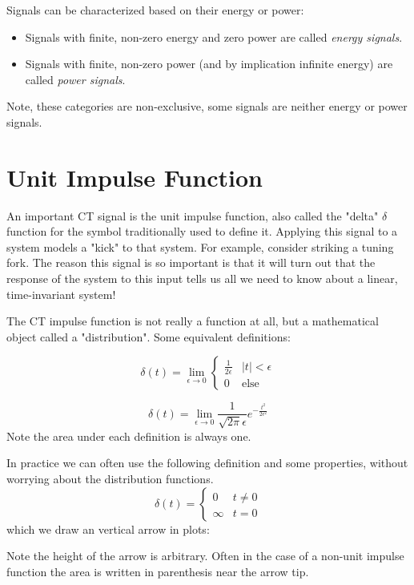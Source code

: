 Signals can be characterized based on their energy or power:  
\begin{itemize}
\item Signals with finite, non-zero energy and zero power are called {\it energy signals}.
\item Signals with finite, non-zero power (and by implication infinite energy) are called {\it power signals}.
\end{itemize}

Note, these categories are non-exclusive, some signals are neither energy or power signals.

\section{Unit Impulse Function}
An important CT signal is the unit impulse function, also called the "delta" $\delta$ function for the symbol traditionally used to define it. Applying this signal to a system models a "kick" to that system. For example, consider striking a tuning fork. The reason this signal is so important is that it will turn out that the response of the system to this input tells us all we need to know about a linear, time-invariant system!

\begin{definition}
The CT impulse function is not really a function at all, but a mathematical object called a "distribution". Some equivalent definitions:

\[
\delta(t) = \lim_{\epsilon \rightarrow 0}\left\{
\begin{array}{ll}
  \frac{1}{2\epsilon} & |t| < \epsilon\\
  0 & \text{else}
\end{array}
\right.
\]

\[
\delta(t) = \lim_{\epsilon \rightarrow 0} \frac{1}{\sqrt{2\pi}\epsilon} e^{-\frac{t^2}{2\epsilon^2}}
\]
Note the area under each definition is always one.
\end{definition}

In practice we can often use the following definition and some properties, without worrying about the distribution functions.
\[
\delta(t) = \left\{
\begin{array}{ll}
  0 & t \neq 0\\
  \infty & t = 0
\end{array}
\right. 
\]
which we draw an vertical arrow in plots:
\begin{center}
\end{center}
Note the height of the arrow is arbitrary. Often in the case of a non-unit impulse function the area is written in parenthesis near the arrow tip.

